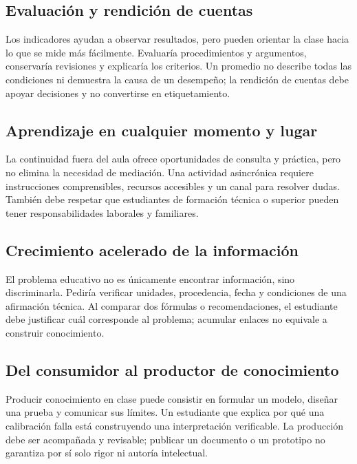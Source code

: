 \documentclass[spanish,letterpaper,oneside]{article}
\begin{document}
\subsection{Evaluación y rendición de cuentas}
Los indicadores ayudan a observar resultados, pero pueden orientar la clase hacia lo que se mide más fácilmente. Evaluaría procedimientos y argumentos, conservaría revisiones y explicaría los criterios. Un promedio no describe todas las condiciones ni demuestra la causa de un desempeño; la rendición de cuentas debe apoyar decisiones y no convertirse en etiquetamiento.
\subsection{Aprendizaje en cualquier momento y lugar}
La continuidad fuera del aula ofrece oportunidades de consulta y práctica, pero no elimina la necesidad de mediación. Una actividad asincrónica requiere instrucciones comprensibles, recursos accesibles y un canal para resolver dudas. También debe respetar que estudiantes de formación técnica o superior pueden tener responsabilidades laborales y familiares.
\subsection{Crecimiento acelerado de la información}
El problema educativo no es únicamente encontrar información, sino discriminarla. Pediría verificar unidades, procedencia, fecha y condiciones de una afirmación técnica. Al comparar dos fórmulas o recomendaciones, el estudiante debe justificar cuál corresponde al problema; acumular enlaces no equivale a construir conocimiento.
\subsection{Del consumidor al productor de conocimiento}
Producir conocimiento en clase puede consistir en formular un modelo, diseñar una prueba y comunicar sus límites. Un estudiante que explica por qué una calibración falla está construyendo una interpretación verificable. La producción debe ser acompañada y revisable; publicar un documento o un prototipo no garantiza por sí solo rigor ni autoría intelectual.
\end{document}
